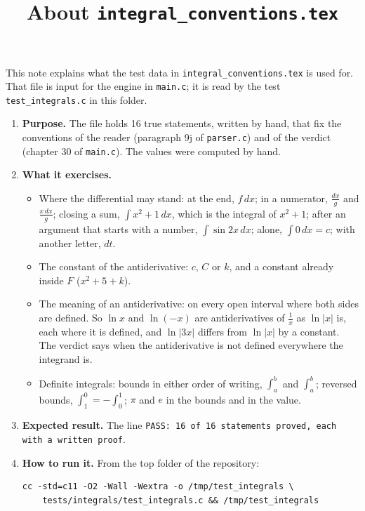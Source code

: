 \documentclass[11pt,a4paper]{article}
\title{About \texttt{integral\_conventions.tex}}
\author{}
\date{}
\begin{document}
\maketitle
This note explains what the test data in \texttt{integral\_conventions.tex} is used for. That file is input for the engine in \texttt{main.c}; it is read by the test \texttt{test\_integrals.c} in this folder.

\begin{enumerate}
\item \textbf{Purpose.} The file holds 16 true statements, written by hand, that fix the conventions of the reader (paragraph 9j of \texttt{parser.c}) and of the verdict (chapter 30 of \texttt{main.c}). The values were computed by hand.

\item \textbf{What it exercises.}
\begin{itemize}
\item Where the differential may stand: at the end, $f \, dx$; in a numerator, $\frac{dx}{g}$ and $\frac{x \, dx}{g}$; closing a sum, $\int x^{2} + 1 \, dx$, which is the integral of $x^{2} + 1$; after an argument that starts with a number, $\int \sin 2x \, dx$; alone, $\int 0 \, dx = c$; with another letter, $dt$.
\item The constant of the antiderivative: $c$, $C$ or $k$, and a constant already inside $F$ ($x^{2} + 5 + k$).
\item The meaning of an antiderivative: on every open interval where both sides are defined. So $\ln x$ and $\ln(-x)$ are antiderivatives of $\frac{1}{x}$ as $\ln|x|$ is, each where it is defined, and $\ln|3x|$ differs from $\ln|x|$ by a constant. The verdict says when the antiderivative is not defined everywhere the integrand is.
\item Definite integrals: bounds in either order of writing, $\int_{a}^{b}$ and $\int^{b}_{a}$; reversed bounds, $\int_{1}^{0} = -\int_{0}^{1}$; $\pi$ and $e$ in the bounds and in the value.
\end{itemize}

\item \textbf{Expected result.} The line \texttt{PASS: 16 of 16 statements proved, each with a written proof}.

\item \textbf{How to run it.} From the top folder of the repository:
\begin{verbatim}
cc -std=c11 -O2 -Wall -Wextra -o /tmp/test_integrals \
    tests/integrals/test_integrals.c && /tmp/test_integrals
\end{verbatim}
\end{enumerate}
\end{document}
